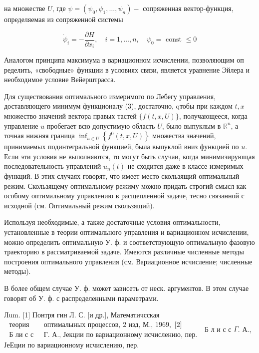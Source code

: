 \documentclass[10pt]{article}
\begin{document}
на множестве $U$, где $\psi=\left(\psi_{0}, \psi_{1}, \ldots, \psi_{n}\right)-$ сопряженная вектор-функция, определяемая из сопряженной системы



\[

\dot{\psi}_{i}=-\frac{\partial H}{\partial x_{i}}, \quad i=1, \ldots, n, \quad \psi_{0}=\text { const } \leqslant 0

\]



Аналогом принципа максимума в вариационном исчислении, позволяющим оп ределить, «свободные» функции в условиях связи, является уравнение Эйлера и необходимое условие Вейерштрасса.



Для существования оптимального измеримого по Лебегу управления, доставляющего минимум функционалу (3), достаточно, qтобы при каждом $t, x$ множество значений вектора правых тастей $\{f(t, x, U)\}$, получающееся, когда управление $u$ пробегает всю допустимую область $U$, было выпуклым в $\mathbb{R}^{n}$, а точная нижняя граница $\inf _{u \in U}\left\{f^{0}(t, x, U)\right\}$ множества значений, принимаемых подинтегральной функцией, была выпуклой вниз функцией по $u$. Если эти условия не выполняются, то могут быть случаи, когда минимизирующая последовательность управлений $u_{n}(t)$ не сходится даже в классе измеримых функций. В этих случаях говорят, что имеет место скользящий оптимальный режим. Скользящему оптимальному режиму можно придать строгий смысл как особому оптимальному управлению в расщепленной задаче, тесно связанной с исходной (см. Оптимальный режим скользящий).



Используя необходимые, а также достаточные условия оптимальности, установленные в теории оптимального управления и вариационном исчислении, можно определить оптимальную У. ф. и соответствующую оптимальную фазовую траекторию в рассматриваемой задаче. Имеются различные численные методы построения оптимального управления (см. Вариационное исчисление; численные методы).



В более общем случае У. ф. может зависеть от неск. аргументов. В этом случае говорят об У. ф. с распределенными параметрами.



Лum. [1] Понтря гин Л. С. [и др.], Математичсская $\begin{array}{ll}\text { теория } & \text { оптималыных процессов, } 2 \text { изд, М., } 1969, \text { [2] } \\ \text { Б ли с с } & \text { Г. А., Јекции по вариационному исчислению, пер. }\end{array}$ Б л и с с $\Gamma$. А., ЈеЕции по вариационному исчислению, пер.
\end{document}
